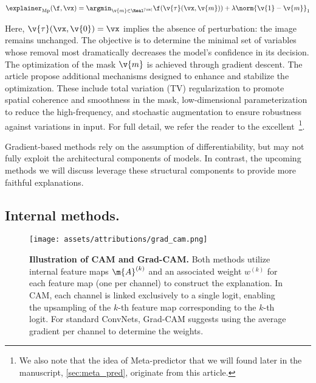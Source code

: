 $$
\explainer_{\text{Mp}}(\f, \vx) = \argmin_{\v{m} \in \Real^{|\sx|}} \f(\v{\tau}(\vx, \v{m})) + \lambda \norm{\v{1} - \v{m}}_1
$$

Here, $\v{\tau}(\vx, \v{0}) = \vx$ implies the absence of perturbation: the image remains unchanged. The objective is to determine the minimal set of variables whose removal most dramatically decreases the model's confidence in its decision. The optimization of the mask $\v{m}$ is achieved through gradient descent. The article propose additional mechanisms designed to enhance and stabilize the optimization. These include total variation (TV) regularization to promote spatial coherence and smoothness in the mask, low-dimensional parameterization to reduce the high-frequency, and stochastic augmentation to ensure robustness against variations in input.  For full detail, we refer the reader to the excellent~\cite{fong2017meaningful}\footnote{We also note that the idea of Meta-predictor that we will found later in the manuscript, \autoref{sec:meta_pred}, originate from this article.}.

\vspace{0.3cm}


Gradient-based methods rely on the assumption of differentiability, but may not fully exploit the architectural components of models. In contrast, the upcoming methods we will discuss leverage these structural components to provide more faithful explanations.

\subsection{Internal methods.}

\begin{figure}[ht]
    \centering
    \texttt{[image: assets/attributions/grad\_cam.png]}
    \caption{\textbf{Illustration of CAM and Grad-CAM.} Both methods utilize internal feature maps $\m{A}^{(k)}$ and an associated weight $w^{(k)}$ for each feature map (one per channel) to construct the explanation. In CAM, each channel is linked exclusively to a single logit, enabling the upsampling of the $k$-th feature map corresponding to the $k$-th logit. For standard ConvNets, Grad-CAM suggests using the average gradient per channel to determine the weights.}
    \label{fig:attributions:gradcam}
\end{figure}

